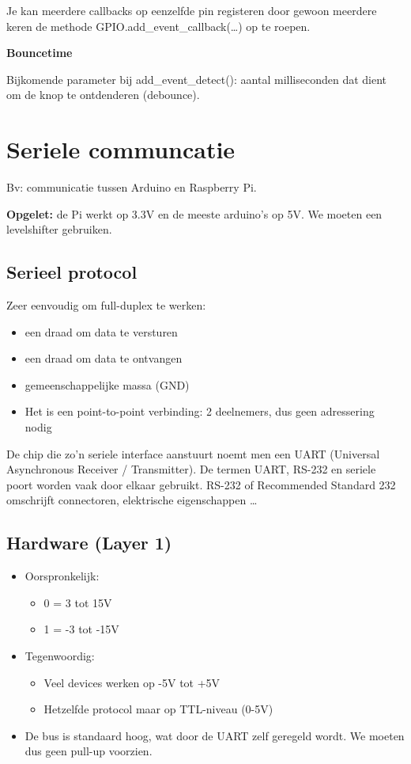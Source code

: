 \documentclass{article}
\newcommand{\bold}[1]{\textbf{#1}}
\begin{document}
Je kan meerdere callbacks op eenzelfde pin registeren door gewoon meerdere keren de methode GPIO.add\_event\_callback(\dots) op te roepen.

\bold{Bouncetime}

Bijkomende parameter bij add\_event\_detect(): aantal milliseconden dat dient om de knop te ontdenderen (debounce). 


\section{Seriele communcatie}
Bv: communicatie tussen Arduino en Raspberry Pi. 

\bold{Opgelet:} de Pi werkt op 3.3V en de meeste arduino's op 5V. 
We moeten een levelshifter gebruiken.

\subsection{Serieel protocol}
Zeer eenvoudig om full-duplex te werken:

\begin{itemize}
    \item een draad om data te versturen
    \item een draad om data te ontvangen
    \item gemeenschappelijke massa (GND)
    \item Het is een point-to-point verbinding: 2 deelnemers, dus geen adressering nodig
\end{itemize}

De chip die zo'n seriele interface aanstuurt noemt men een UART (Universal Asynchronous Receiver / Transmitter).
De termen UART, RS-232 en seriele poort worden vaak door elkaar gebruikt. RS-232 of Recommended Standard 232
omschrijft connectoren, elektrische eigenschappen \dots

\subsection{Hardware (Layer 1)}
\begin{itemize}
    \item Oorspronkelijk:
    \begin{itemize}
        \item 0 = 3 tot 15V
        \item 1 = -3 tot -15V
    \end{itemize}
    \item Tegenwoordig:
    \begin{itemize}
        \item Veel devices werken op -5V tot +5V
        \item Hetzelfde protocol maar op TTL-niveau (0-5V)
    \end{itemize}
    \item De bus is standaard hoog, wat door de UART zelf geregeld wordt. We moeten dus geen pull-up voorzien.
\end{itemize}
\end{document}
